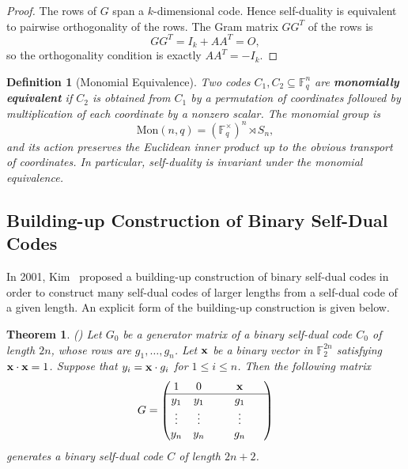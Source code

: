 \documentclass[12pt]{article}
\newtheorem{defn}{Definition}[section]
\newtheorem{theorem}{Theorem}[section]
\newcommand{\F}{\mathbb{F}}
\newcommand{\Mon}{\mathrm{Mon}}
\begin{document}
\begin{proof}
The rows of $G$ span a $k$-dimensional code. Hence self-duality is equivalent to pairwise orthogonality of the rows. The Gram matrix $GG^T$ of the rows is
\[
GG^T = I_k + AA^T = O,
\]
so the orthogonality condition is exactly $AA^T = -I_k$.
\end{proof}

\begin{defn}[Monomial Equivalence]\label{def:mon-equiv}
{\rm
Two codes $C_1, C_2 \subseteq \F_q^n$ are \textbf{monomially equivalent} if $C_2$ is obtained from $C_1$ by a permutation of coordinates followed by multiplication of each coordinate by a nonzero scalar. The monomial group is
\[
\Mon(n,q) = (\F_q^\times)^n \rtimes S_n,
\]
and its action preserves the Euclidean inner product up to the obvious transport of coordinates. In particular, self-duality is invariant under the monomial equivalence.
}
\end{defn}


\subsection{Building-up Construction of Binary Self-Dual Codes}

In 2001, Kim~\cite{Kim2001} proposed a building-up construction of binary self-dual codes in order to construct many self-dual codes of larger lengths from a self-dual code of a given length. An explicit form of the building-up construction is given below.

\begin{theorem}(\cite[Theorem 1]{Kim2001}) \label{thm-binary-build-1}
Let $G_0$ be a generator matrix of a binary self-dual code $C_0$ of length $2n$, whose rows are $g_1, \dots, g_n$. Let $\bf x$ be a binary vector in $\mathbb F_2^{2n}$ satisfying ${\bf x} \cdot {\bf x} = 1$. Suppose that $y_i ={\bf x} \cdot g_i$ for $1 \le i \le n$. Then the following matrix
\[
G=
\begin{pmatrix}
1 & 0 & ~~~~~ {\bf x} ~~~~~\\
\hline
y_1 &  y_1 & ~~~~~ g_1 ~~~~~\\
\vdots & \vdots & ~~~~~ \vdots ~~~~~ \\
y_{n} & y_{n} & ~~~~~ g_{n} ~~~~~
\end{pmatrix}
\]
generates a binary self-dual code $C$ of length $2n+2$.
\end{theorem}
\end{document}
